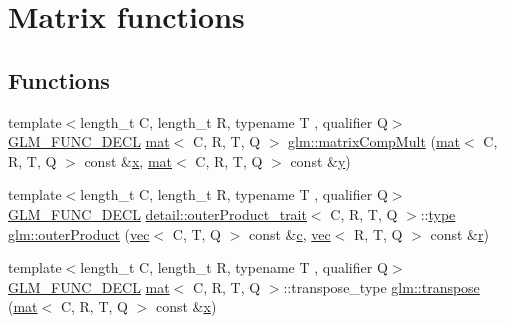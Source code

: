 \hypertarget{group__core__func__matrix}{}\section{Matrix functions}
\label{group__core__func__matrix}
\subsection*{Functions}
\begin{DoxyCompactItemize}
\item 
{\footnotesize template$<$length\+\_\+t C, length\+\_\+t R, typename T , qualifier Q$>$ }\\\mbox{\hyperlink{setup_8hpp_ab2d052de21a70539923e9bcbf6e83a51}{G\+L\+M\+\_\+\+F\+U\+N\+C\+\_\+\+D\+E\+CL}} \mbox{\hyperlink{structglm_1_1mat}{mat}}$<$ C, R, T, Q $>$ \mbox{\hyperlink{group__core__func__matrix_gaf14569404c779fedca98d0b9b8e58c1f}{glm\+::matrix\+Comp\+Mult}} (\mbox{\hyperlink{structglm_1_1mat}{mat}}$<$ C, R, T, Q $>$ const \&\mbox{\hyperlink{_s_d_l__opengl_8h_ad0e63d0edcdbd3d79554076bf309fd47}{x}}, \mbox{\hyperlink{structglm_1_1mat}{mat}}$<$ C, R, T, Q $>$ const \&\mbox{\hyperlink{_s_d_l__opengl_8h_a1675d9d7bb68e1657ff028643b4037e3}{y}})
\item 
{\footnotesize template$<$length\+\_\+t C, length\+\_\+t R, typename T , qualifier Q$>$ }\\\mbox{\hyperlink{setup_8hpp_ab2d052de21a70539923e9bcbf6e83a51}{G\+L\+M\+\_\+\+F\+U\+N\+C\+\_\+\+D\+E\+CL}} \mbox{\hyperlink{structglm_1_1detail_1_1outer_product__trait}{detail\+::outer\+Product\+\_\+trait}}$<$ C, R, T, Q $>$\+::\mbox{\hyperlink{structglm_1_1type}{type}} \mbox{\hyperlink{group__core__func__matrix_gac29fb7bae75a8e4c1b74cbbf85520e50}{glm\+::outer\+Product}} (\mbox{\hyperlink{structglm_1_1vec}{vec}}$<$ C, T, Q $>$ const \&\mbox{\hyperlink{_s_d_l__opengl__glext_8h_a1f2d7f8147412c43ba2303a56f97ee73}{c}}, \mbox{\hyperlink{structglm_1_1vec}{vec}}$<$ R, T, Q $>$ const \&\mbox{\hyperlink{_s_d_l__opengl_8h_a42ce7cdc612e53abee15043f80220d97}{r}})
\item 
{\footnotesize template$<$length\+\_\+t C, length\+\_\+t R, typename T , qualifier Q$>$ }\\\mbox{\hyperlink{setup_8hpp_ab2d052de21a70539923e9bcbf6e83a51}{G\+L\+M\+\_\+\+F\+U\+N\+C\+\_\+\+D\+E\+CL}} \mbox{\hyperlink{structglm_1_1mat}{mat}}$<$ C, R, T, Q $>$\+::transpose\+\_\+type \mbox{\hyperlink{group__core__func__matrix_gae679d841da8ce9dbcc6c2d454f15bc35}{glm\+::transpose}} (\mbox{\hyperlink{structglm_1_1mat}{mat}}$<$ C, R, T, Q $>$ const \&\mbox{\hyperlink{_s_d_l__opengl_8h_ad0e63d0edcdbd3d79554076bf309fd47}{x}})

\end{DoxyCompactItemize}
